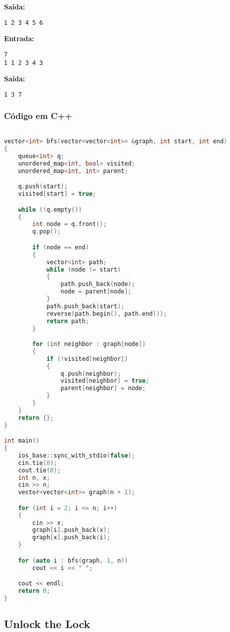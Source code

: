 \textbf{Saída:}
\begin{verbatim}
1 2 3 4 5 6 
\end{verbatim}

\textbf{Entrada:}
\begin{verbatim}
7
1 1 2 3 4 3
\end{verbatim}

\textbf{Saída:}
\begin{verbatim}
1 3 7 
\end{verbatim}

\subsubsection*{Código em C++}
\begin{lstlisting}[language=C++]

vector<int> bfs(vector<vector<int>> &graph, int start, int end)
{
    queue<int> q;
    unordered_map<int, bool> visited;
    unordered_map<int, int> parent;

    q.push(start);
    visited[start] = true;

    while (!q.empty())
    {
        int node = q.front();
        q.pop();

        if (node == end)
        {
            vector<int> path;
            while (node != start)
            {
                path.push_back(node);
                node = parent[node];
            }
            path.push_back(start);
            reverse(path.begin(), path.end());
            return path;
        }

        for (int neighbor : graph[node])
        {
            if (!visited[neighbor])
            {
                q.push(neighbor);
                visited[neighbor] = true;
                parent[neighbor] = node;
            }
        }
    }
    return {};
}

int main()
{
    ios_base::sync_with_stdio(false);
    cin.tie(0);
    cout.tie(0);
    int n, x;
    cin >> n;
    vector<vector<int>> graph(n + 1);

    for (int i = 2; i <= n; i++)
    {
        cin >> x;
        graph[i].push_back(x);
        graph[x].push_back(i);
    }

    for (auto i : bfs(graph, 1, n))
        cout << i << " ";

    cout << endl;
    return 0;
}
\end{lstlisting}


\subsection{Unlock the Lock}

